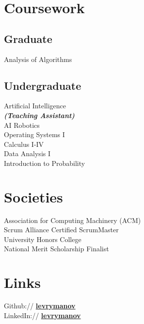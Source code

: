 \documentclass[]{deedy-resume-reversed}
\begin{document}
\begin{minipage}[t]{0.33\textwidth}

\section{Coursework}
\subsection{Graduate}
Analysis of Algorithms
\sectionsep

\subsection{Undergraduate}
Artificial Intelligence \\
{\footnotesize \textit{\textbf{(Teaching Assistant) }}} \\
AI Robotics \\
Operating Systems I \\
Calculus I-IV \\
Data Analysis I \\
Introduction to Probability \\
\sectionsep


\section{Societies}
Association for Computing Machinery (ACM)\\
Scrum Alliance Certified ScrumMaster\\
University Honors College\\
National Merit Scholarship Finalist \\
\sectionsep


\section{Links}
Github:// \href{https://github.com/}{\bf levrymanov} \\
LinkedIn://  \href{https://www.linkedin.com/}{\bf levrymanov}
\sectionsep

\end{minipage}
\end{document}
